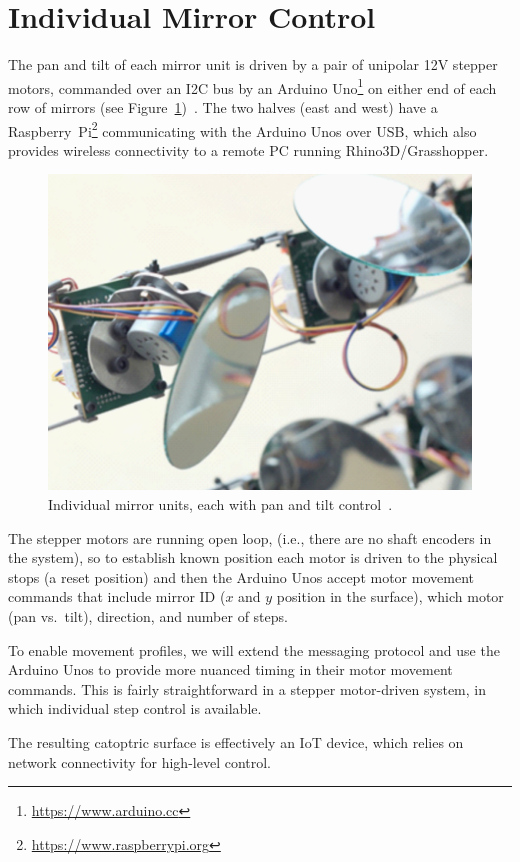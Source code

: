 \section{Individual Mirror Control}
\label{sec:mirror}

The pan and tilt of each mirror unit is driven by a pair of
unipolar 12V stepper motors, commanded over an I2C bus by an
Arduino Uno\footnote{\url{https://www.arduino.cc}} on either end of
each row of mirrors (see Figure~\ref{fig:mirror})~\cite{acadia18}.
The two halves (east and west) have a
Raspberry~Pi\footnote{\url{https://www.raspberrypi.org}}
communicating with the Arduino Unos over USB, which also provides
wireless connectivity to a remote PC running Rhino3D/Grasshopper.

\begin{figure}[ht]
\centering
\includegraphics[width=0.98\columnwidth]{mirror}
\caption{Individual mirror units,
each with pan and tilt control~\protect\cite{acadia18}.}
\label{fig:mirror}
\end{figure}

The stepper motors are running open loop,
(i.e., there are no shaft encoders in the system),
so to establish known position each
motor is driven to the physical stops (a reset position) and then
the Arduino Unos accept motor movement commands that include
mirror ID ($x$ and $y$ position in the surface), which motor (pan vs.\ tilt),
direction, and number of steps.

To enable movement profiles, we will extend the messaging protocol
and use the Arduino Unos to provide more nuanced timing in their
motor movement commands. This is fairly straightforward in a stepper
motor-driven system, in which individual step control is available.

The resulting catoptric surface is effectively an IoT device, which
relies on network connectivity for high-level control.
